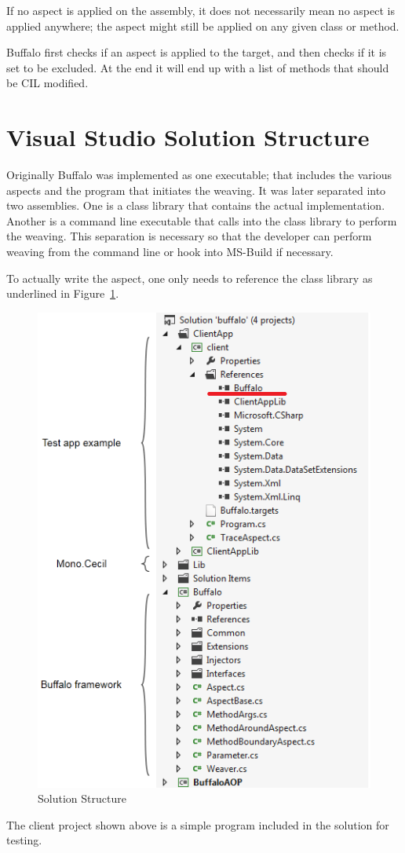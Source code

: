 If no aspect is applied on the assembly, it does not necessarily mean no aspect is applied anywhere; the aspect might still be applied on any given class or method.

Buffalo first checks if an aspect is applied to the target, and then checks if it is set to be excluded. At the end it will end up with a list of methods that should be CIL modified.

\section{Visual Studio Solution Structure}

Originally Buffalo was implemented as one executable; that includes the various aspects and the program that initiates the weaving. It was later separated into two assemblies. One is a class library that contains the actual implementation. Another is a command line executable that calls into the class library to perform the weaving. This separation is necessary so that the developer can perform weaving from the command line or hook into MS-Build if necessary. 

To actually write the aspect, one only needs to reference the class library as underlined in Figure~\ref{solutionexplorer}.

\begin{figure}[H]
  \includegraphics[scale=1.0]{SolutionExplorer3.PNG}
  \centering
  \caption{Solution Structure\label{solutionexplorer}}
\end{figure}

The client project shown above is a simple program included in the solution for testing.

